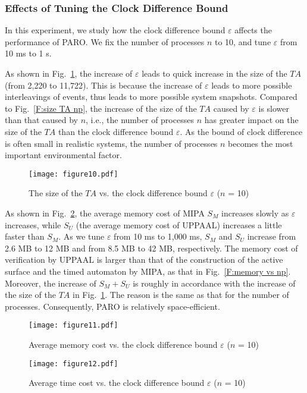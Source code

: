 \documentclass[10pt,conference,compsocconf,letterpaper]{IEEEtran}
\begin{document}
\subsubsection{Effects of Tuning the Clock Difference Bound}

In this experiment, we study how the clock difference bound $\varepsilon$ affects the performance of \textsf{PARO}. We fix the number of processes $n$ to 10, and tune $\varepsilon$ from 10 ms to 1 s.

As shown in Fig.~\ref{F:size TA e}, the increase of $\varepsilon$ leads to quick increase in the size of the $TA$ (from 2,220 to 11,722). This is because the increase of $\varepsilon$ leads to more possible interleavings of events, thus leads to more possible system snapshots. Compared to Fig.~\ref{F:size TA np}, the increase of the size of the $TA$ caused by $\varepsilon$ is slower than that caused by $n$, i.e., the number of processes $n$ has greater impact on the size of the $TA$ than the clock difference bound $\varepsilon$. As the bound of clock difference is often small in realistic systems, the number of processes $n$ becomes the most important environmental factor.
\begin{figure}[tbp]
\begin{center}
  \texttt{[image: figure10.pdf]}
  \caption{The size of the $TA$ vs. the clock difference bound $\varepsilon$ ($n$ = 10)}
  \label{F:size TA e}
\end{center}
\end{figure}

As shown in Fig.~\ref{F:memory vs e}, the average memory cost of MIPA $S_M$ increases slowly as $\varepsilon$ increases, while $S_U$ (the average memory cost of UPPAAL) increases a little faster than $S_M$. As we tune $\varepsilon$ from 10 ms to 1,000 ms, $S_M$ and $S_U$ increase from 2.6 MB to 12 MB and from 8.5 MB to 42 MB, respectively. The memory cost of verification by UPPAAL is larger than that of the construction of the active surface and the timed automaton by MIPA, as that in Fig.~\ref{F:memory vs np}. Moreover, the increase of $S_M + S_U$ is roughly in accordance with the increase of the size of the $TA$ in Fig.~\ref{F:size TA e}. The reason is the same as that for the number of processes. Consequently, \textsf{PARO} is relatively space-efficient.
\begin{figure}[tbp]
\begin{center}
  \texttt{[image: figure11.pdf]}
  \caption{Average memory cost vs. the clock difference bound $\varepsilon$ ($n$ = 10)}
  \label{F:memory vs e}
\end{center}
\end{figure}
\begin{figure}[tbp]
\begin{center}
  \texttt{[image: figure12.pdf]}
  \caption{Average time cost vs. the clock difference bound $\varepsilon$ ($n$ = 10)}
  \label{F:time vs e}
\end{center}
\end{figure}
\end{document}
